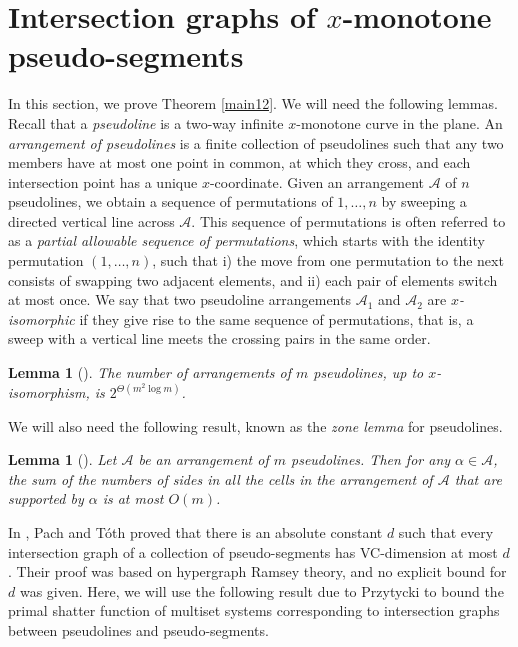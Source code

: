\documentclass[11pt]{article}
\theoremstyle{plain}
\newtheorem{lemma}[theorem]{Lemma}
\theoremstyle{definition}
\theoremstyle{remark}
\begin{document}
 
 
  
 




\section{Intersection graphs of $x$-monotone pseudo-segments}\label{secpseudo}


In this section, we prove Theorem \ref{main12}.  We will need the following lemmas.  Recall that a \emph{pseudoline} is a two-way infinite $x$-monotone curve in the plane. An \emph{arrangement of pseudolines} is a finite collection of pseudolines such that any two members have at most one point in common, at which they cross, and each intersection point has a unique $x$-coordinate.  Given an arrangement $\mathcal{A}$ of $n$ pseudolines, we obtain a sequence of permutations of $1,\ldots, n$ by sweeping a directed vertical line across $\mathcal{A}$.  This sequence of permutations is often referred to as a \emph{partial allowable sequence of permutations}, which starts with the identity permutation $(1,\ldots, n)$, such that i) the move from one permutation to the next consists of swapping two adjacent elements, and ii) each pair of elements switch at most once.  We say that two pseudoline arrangements $\mathcal{A}_1$ and $\mathcal{A}_2$ are \emph{$x$-isomorphic} if they give rise to the same sequence of permutations, that is, a sweep with a vertical line meets the crossing pairs in the same order.  


\begin{lemma}[\cite{St}]\label{arrange}
The number of arrangements of $m$ pseudolines, up to $x$-isomorphism, is $2^{\Theta(m^2\log m)}$.
    
\end{lemma}

We will also need the following result, known as the \emph{zone lemma} for pseudolines.

\begin{lemma}[\cite{bern}]\label{zone}
    Let $\mathcal{A}$ be an arrangement of $m$ pseudolines.  Then for any $\alpha \in \mathcal{A}$, the sum of the numbers of sides in all the cells in the arrangement of $\mathcal{A}$ that are supported by $\alpha$ is at most $O(m)$.
\end{lemma}

In \cite{PT06}, Pach and T\'oth proved that there is an absolute constant $d$ such that every intersection graph of a collection of pseudo-segments has VC-dimension at most $d$.  Their proof was based on hypergraph Ramsey theory, and no explicit bound for $d$ was given.  Here, we will use the following result due to Przytycki \cite{P} to bound the primal shatter function of multiset systems corresponding to intersection graphs between pseudolines and pseudo-segments.
 
\end{document}
